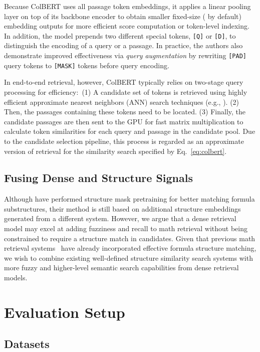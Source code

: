 \documentclass[11pt]{article}
\begin{document}
Because ColBERT uses all passage token embeddings, it applies a linear pooling layer on top of its backbone encoder to obtain smaller fixed-size ( by default) embedding outputs for more efficient score computation or token-level indexing.
In addition, the model prepends two different special tokens, \texttt{[Q]} or \texttt{[D]}, to distinguish the encoding of a query or a passage.
In practice, the authors also demonstrate improved effectiveness via \textit{query augmentation} by rewriting \texttt{[PAD]} query tokens to \texttt{[MASK]} tokens before query encoding.

In end-to-end retrieval, however, ColBERT typically relies on two-stage query processing for efficiency:\
(1) A candidate set of tokens is retrieved using highly efficient approximate nearest neighbors (ANN) search techniques (e.g., \citealp{jegou2011IVFADC_R}).
(2) Then, the passages containing these tokens need to be located.
(3) Finally, the candidate passages are then sent to the GPU for fast matrix multiplication to calculate token similarities for each query and passage in the candidate pool.
Due to the candidate selection pipeline, this process is regarded as an approximate version of retrieval for the similarity search specified by  Eq.~\ref{eq:colbert}.

\subsection{Fusing Dense and Structure Signals}

Although \citet{peng2021mathbert} have performed structure mask pretraining for better matching formula substructures, their method is still based on additional structure embeddings generated from a different system.
However, we argue that a dense retrieval model may excel at adding fuzziness and recall to math retrieval without being constrained to require a structure match in candidates.
Given that previous math retrieval systems~\cite{zhong2020accelerating,zhong2021aa} have already incorporated effective formula structure matching, we wish to combine existing well-defined structure similarity search systems with more fuzzy and higher-level semantic search capabilities from dense retrieval models.

\section{Evaluation Setup}

\subsection{Datasets}
\end{document}
